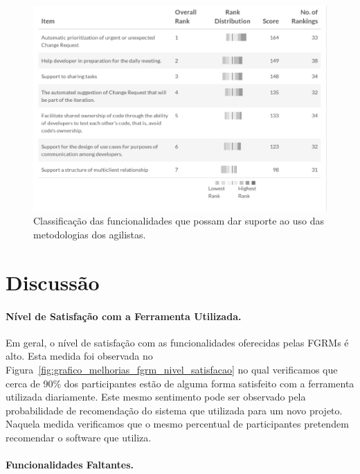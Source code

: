 \begin{figure}[htpb]
	\centering
	\includegraphics[width=0.8\linewidth]{./chapter-pesquisa-com-profissionais/img/grafico_melhorias_fgrm_suporte_particas_ageis.pdf}
	\caption{Classificação das funcionalidades que possam dar suporte ao uso das
	metodologias dos agilistas.}
\label{fig:grafico_melhorias_fgrm_suporte_particas_ageis}
\end{figure}

\section{Discussão}

\paragraph{Nível de Satisfação com a Ferramenta Utilizada.}
\label{par:pesq_profissionais_nivel_de_satisfação}

Em geral, o nível de satisfação com as funcionalidades oferecidas pelas FGRMs é
alto. Esta medida foi observada no
Figura~\ref{fig:grafico_melhorias_fgrm_nivel_satisfacao} no qual verificamos que
cerca de 90\% dos participantes estão de alguma forma satisfeito com a
ferramenta utilizada diariamente. Este mesmo sentimento pode ser observado pela
probabilidade de recomendação do sistema que utilizada para um novo projeto.
Naquela medida verificamos que o mesmo percentual de participantes pretendem
recomendar o software que utiliza.

\paragraph{Funcionalidades Faltantes.}
\label{par:pesq_profissionais_funcionalidades_faltantes}

